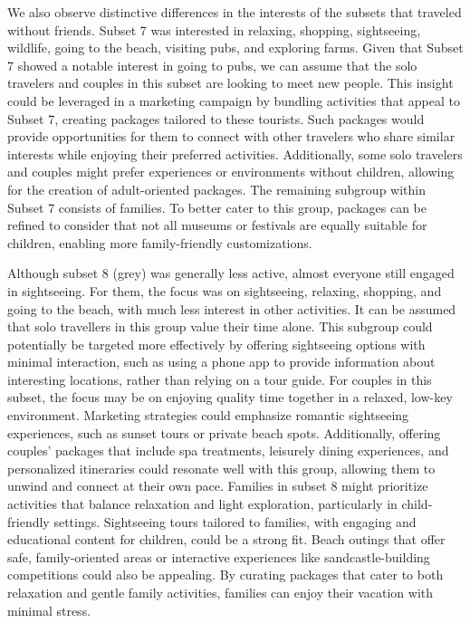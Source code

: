 \documentclass[article]{ajs}
\begin{document}
We also observe distinctive differences in the interests of the subsets that traveled without friends. Subset 7 was interested in relaxing, shopping, sightseeing, wildlife, going to the beach, visiting pubs, and exploring farms. Given that Subset 7 showed a notable interest in going to pubs, we can assume that the solo travelers and couples in this subset are looking to meet new people. This insight could be leveraged in a marketing campaign by bundling activities that appeal to Subset 7, creating packages tailored to these tourists. Such packages would provide opportunities for them to connect with other travelers who share similar interests while enjoying their preferred activities. Additionally, some solo travelers and couples might prefer experiences or environments without children, allowing for the creation of adult-oriented packages. The remaining subgroup within Subset 7 consists of families. To better cater to this group, packages can be refined to consider that not all museums or festivals are equally suitable for children, enabling more family-friendly customizations.

Although subset 8 (grey) was generally less active, almost everyone still engaged in sightseeing. For them, the focus was on sightseeing, relaxing, shopping, and going to the beach, with much less interest in other activities. It can be assumed that solo travellers in this group value their time alone. This subgroup could potentially be targeted more effectively by offering sightseeing options with minimal interaction, such as using a phone app to provide information about interesting locations, rather than relying on a tour guide. For couples in this subset, the focus may be on enjoying quality time together in a relaxed, low-key environment. Marketing strategies could emphasize romantic sightseeing experiences, such as sunset tours or private beach spots. Additionally, offering couples' packages that include spa treatments, leisurely dining experiences, and personalized itineraries could resonate well with this group, allowing them to unwind and connect at their own pace. Families in subset 8 might prioritize activities that balance relaxation and light exploration, particularly in child-friendly settings. Sightseeing tours tailored to families, with engaging and educational content for children, could be a strong fit. Beach outings that offer safe, family-oriented areas or interactive experiences like sandcastle-building competitions could also be appealing. By curating packages that cater to both relaxation and gentle family activities, families can enjoy their vacation with minimal stress.
\end{document}
